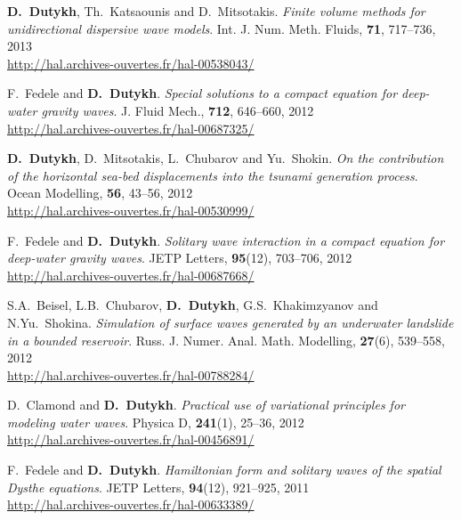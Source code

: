 \begin{etaremune}
  \item \textbf{D.~Dutykh}, Th.~Katsaounis and D.~Mitsotakis. \textit{Finite volume methods for unidirectional dispersive wave models}. Int. J. Num. Meth. Fluids, \textbf{71}, 717--736, 2013 \\ %
  \url{http://hal.archives-ouvertes.fr/hal-00538043/}
  

  \item F.~Fedele and \textbf{D.~Dutykh}. \textit{Special solutions to a compact equation for deep-water gravity waves}. J. Fluid Mech., \textbf{712}, 646--660, 2012 \\ %
  \url{http://hal.archives-ouvertes.fr/hal-00687325/}

  \item \textbf{D.~Dutykh}, D.~Mitsotakis, L.~Chubarov and Yu.~Shokin. \textit{On the contribution of the horizontal sea-bed displacements into the tsunami generation process}. Ocean Modelling, \textbf{56}, 43--56, 2012 \\ %
  \url{http://hal.archives-ouvertes.fr/hal-00530999/}
  
 \item F.~Fedele and \textbf{D.~Dutykh}. \textit{Solitary wave interaction in a compact equation for deep-water gravity waves}. JETP Letters, \textbf{95}(12), 703--706, 2012 \\ %
  \url{http://hal.archives-ouvertes.fr/hal-00687668/}

  \item S.A.~Beisel, L.B.~Chubarov, \textbf{D.~Dutykh}, G.S.~Khakimzyanov and N.Yu.~Shokina. \textit{Simulation of surface waves generated by an underwater landslide in a bounded reservoir}. Russ. J. Numer. Anal. Math. Modelling, \textbf{27}(6), 539--558, 2012 \\ %
  \url{http://hal.archives-ouvertes.fr/hal-00788284/}

  \item D.~Clamond and \textbf{D.~Dutykh}. \textit{Practical use of variational principles for modeling water waves}. Physica D, \textbf{241}(1), 25--36, 2012 \\ %
  \url{http://hal.archives-ouvertes.fr/hal-00456891/}


  \item F.~Fedele and \textbf{D.~Dutykh}. \textit{Hamiltonian form and solitary waves of the spatial Dysthe equations}. JETP Letters, \textbf{94}(12), 921--925, 2011 \\ %
  \url{http://hal.archives-ouvertes.fr/hal-00633389/}


\end{etaremune}
